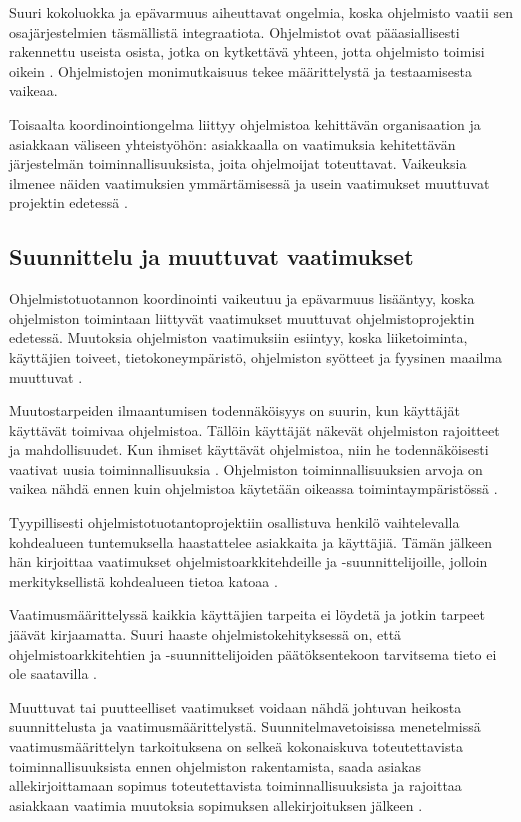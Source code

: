 \documentclass[finnish]{tktltiki2}
\theoremstyle{definition}
\theoremstyle{remark}
\begin{document}
Suuri kokoluokka ja epävarmuus aiheuttavat ongelmia, koska ohjelmisto vaatii sen osajärjestelmien täsmällistä integraatiota. Ohjelmistot ovat pääasiallisesti rakennettu useista osista, jotka on kytkettävä yhteen, jotta ohjelmisto toimisi oikein \cite{KES95}. Ohjelmistojen monimutkaisuus tekee määrittelystä ja testaamisesta vaikeaa\cite{BOE06}. 

Toisaalta koordinointiongelma liittyy ohjelmistoa kehittävän organisaation ja asiakkaan väliseen yhteistyöhön: asiakkaalla on vaatimuksia kehitettävän järjestelmän toiminnallisuuksista, joita ohjelmoijat toteuttavat. Vaikeuksia ilmenee näiden vaatimuksien ymmärtämisessä ja usein vaatimukset muuttuvat projektin edetessä \cite{FOW01a}. 

\subsection{Suunnittelu ja muuttuvat vaatimukset}

Ohjelmistotuotannon koordinointi vaikeutuu ja epävarmuus lisääntyy, koska ohjelmiston toimintaan liittyvät vaatimukset muuttuvat ohjelmistoprojektin edetessä. Muutoksia ohjelmiston vaatimuksiin esiintyy, koska liiketoiminta, käyttäjien toiveet, tietokoneympäristö, ohjelmiston syötteet ja fyysinen maailma muuttuvat \cite{KES95}.

Muutostarpeiden ilmaantumisen todennäköisyys on suurin, kun käyttäjät käyttävät toimivaa ohjelmistoa. Tällöin käyttäjät näkevät ohjelmiston rajoitteet ja mahdollisuudet. Kun ihmiset käyttävät ohjelmistoa, niin he todennäköisesti vaativat uusia toiminnallisuuksia \cite{KES95}. Ohjelmiston toiminnallisuuksien arvoja on vaikea nähdä ennen kuin ohjelmistoa käytetään oikeassa toimintaympäristössä \cite{FOW01a}.

Tyypillisesti ohjelmistotuotantoprojektiin osallistuva henkilö vaihtelevalla kohdealueen tuntemuksella haastattelee asiakkaita ja käyttäjiä. Tämän jälkeen hän kirjoittaa vaatimukset ohjelmistoarkkitehdeille ja -suunnittelijoille, jolloin merkityksellistä kohdealueen tietoa katoaa \cite{KES95}.

Vaatimusmäärittelyssä kaikkia käyttäjien tarpeita ei löydetä ja jotkin tarpeet jäävät kirjaamatta. Suuri haaste ohjelmistokehityksessä on, että ohjelmistoarkkitehtien ja -suunnittelijoiden päätöksentekoon tarvitsema tieto ei ole saatavilla \cite{KES95}.  

Muuttuvat tai puutteelliset vaatimukset voidaan nähdä johtuvan heikosta suunnittelusta ja vaatimusmäärittelystä. Suunnitelmavetoisissa menetelmissä vaatimusmäärittelyn tarkoituksena on selkeä kokonaiskuva toteutettavista toiminnallisuuksista ennen ohjelmiston rakentamista, saada asiakas allekirjoittamaan sopimus toteutettavista toiminnallisuuksista ja rajoittaa asiakkaan vaatimia muutoksia sopimuksen allekirjoituksen jälkeen \cite{FOW01a}.
\end{document}
